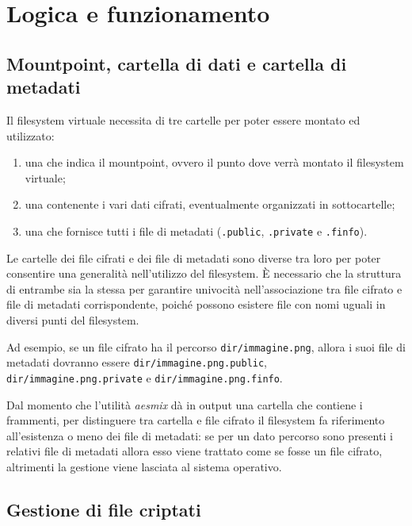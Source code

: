 \documentclass[a4paper,12pt,twoside,openright]{report}
\begin{document}
  \section{Logica e funzionamento}

  \subsection{Mountpoint, cartella di dati e cartella di metadati}

  Il filesystem virtuale necessita di tre cartelle per poter essere montato ed utilizzato:

  \begin{enumerate}
    \item una che indica il mountpoint, ovvero il punto dove verrà montato il \mbox{filesystem} virtuale;
    \item una contenente i vari dati cifrati, eventualmente organizzati in sottocartelle;
    \item una che fornisce tutti i file di metadati (\texttt{.public}, \texttt{.private} e \texttt{.finfo}).
  \end{enumerate}

  Le cartelle dei file cifrati e dei file di metadati sono diverse tra loro per poter consentire
  una generalità nell'utilizzo del filesystem.
  È necessario che la struttura di entrambe sia la stessa per garantire univocità nell'associazione tra file
  cifrato e file di metadati corrispondente, poiché possono esistere file con nomi uguali in diversi punti
  del filesystem.

  Ad esempio, se un file cifrato ha il percorso \texttt{dir/immagine.png}, allora i suoi file di metadati
  dovranno essere \texttt{dir/immagine.png.public},
  \texttt{dir/immagine.png.private} e \texttt{dir/immagine.png.finfo}.
  
  Dal momento che l'utilità \textit{aesmix} dà in output una cartella che contiene i frammenti, per
  distinguere tra cartella e file cifrato il filesystem fa riferimento all'esistenza o meno
  dei file di metadati: se per un dato percorso sono presenti i relativi file di metadati
  allora esso viene trattato come se fosse un file cifrato, altrimenti la gestione viene lasciata
  al sistema operativo.

  \subsection{Gestione di file criptati}
  \label{section-file-criptati}
\end{document}
